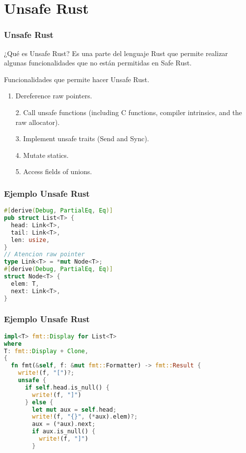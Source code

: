 \documentclass{beamer}
\begin{document}
\section{Unsafe Rust}
\begin{frame}
  \frametitle{Unsafe Rust}
  \begin{block}{¿Qué es Unsafe Rust?}
    Es una parte del lenguaje Rust que permite realizar algunas funcionalidades que no están permitidas en Safe Rust.
  \end{block}
  \bigbreak
  Funcionalidades que permite hacer Unsafe Rust.
  \begin{enumerate}[1.]
    \item Dereference raw pointers.
    \pause
    \item [2.] Call unsafe functions (including C functions, compiler intrinsics, and the raw allocator).
    \pause
    \item [3.] Implement unsafe traits (Send and Sync).
    \pause
    \item [4.] Mutate statics.
    \pause
    \item [5.] Access fields of unions.
  \end{enumerate}
\end{frame}

\begin{frame}[fragile]
  \frametitle{Ejemplo Unsafe Rust}
  \begin{lstlisting}[language=Rust , style=boxed]
#[derive(Debug, PartialEq, Eq)]
pub struct List<T> {
  head: Link<T>,
  tail: Link<T>,
  len: usize,
}
// Atencion raw pointer
type Link<T> = *mut Node<T>;
#[derive(Debug, PartialEq, Eq)]
struct Node<T> {
  elem: T,
  next: Link<T>,
}\end{lstlisting}
\end{frame}

\begin{frame}[fragile]
  \frametitle{Ejemplo Unsafe Rust}
  \begin{lstlisting}[language=Rust , style=boxed]
impl<T> fmt::Display for List<T> 
where 
T: fmt::Display + Clone, 
{
  fn fmt(&self, f: &mut fmt::Formatter) -> fmt::Result {
    write!(f, "[")?;
    unsafe {
      if self.head.is_null() {
        write!(f, "]")
      } else {
        let mut aux = self.head;
        write!(f, "{}", (*aux).elem)?;
        aux = (*aux).next;
        if aux.is_null() {
          write!(f, "]")
        }\end{lstlisting}
\end{frame}
\end{document}
